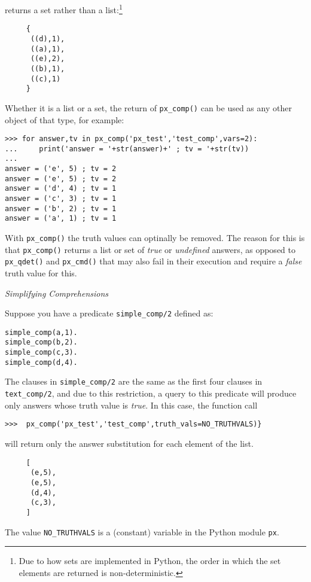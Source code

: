 \begin{example}
\noindent
returns a set rather than a list:\footnote{Due to how sets are
  implemented in Python, the order in which the set elements are
  returned is non-deterministic.}

{\small  
\begin{verbatim}
     {
      ((d),1),
      ((a),1),
      ((e),2),
      ((b),1),
      ((c),1) 
     }
\end{verbatim}
}

Whether it is a list or a set, the return of {\tt px\_comp()} can be
used as any other object of that type, for example:

{\small
  \begin{verbatim}
>>> for answer,tv in px_comp('px_test','test_comp',vars=2):
...     print('answer = '+str(answer)+' ; tv = '+str(tv))
... 
answer = ('e', 5) ; tv = 2
answer = ('e', 5) ; tv = 2
answer = ('d', 4) ; tv = 1
answer = ('c', 3) ; tv = 1
answer = ('b', 2) ; tv = 1
answer = ('a', 1) ; tv = 1
\end{verbatim}
  }
\end{example}

With {\tt px\_comp()} the truth values can optinally be removed.  The
reason for this is that {\tt px\_comp()} returns a list or set of {\em
  true} or {\em undefined} answers, as opposed to {\tt px\_qdet()} and
{\tt px\_cmd()} that may also fail in their execution and require a
{\em false} truth value for this.

\begin{example} \rm {\it Simplifying Comprehensions}

  Suppose you have a predicate {\tt simple\_comp/2} defined as:

{\small  
\begin{verbatim}  
simple_comp(a,1).
simple_comp(b,2).
simple_comp(c,3).
simple_comp(d,4).
\end{verbatim}
}

  The clauses in {\tt simple\_comp/2} are the same as the first four
  clauses in {\tt text\_comp/2}, and due to this restriction, a query
  to this predicate will produce only answers whose truth value is
  {\em true}.  In this case, the function call

\begin{verbatim}  
>>>  px_comp('px_test','test_comp',truth_vals=NO_TRUTHVALS)}
\end{verbatim}

will return only the answer substitution for each element of the list.

{\small  
\begin{verbatim}
     [
      (e,5),
      (e,5),
      (d,4),
      (c,3),
     ]
\end{verbatim}
}

The value {\tt NO\_TRUTHVALS} is a (constant) variable in the Python
module {\tt px}.
\end{example}

